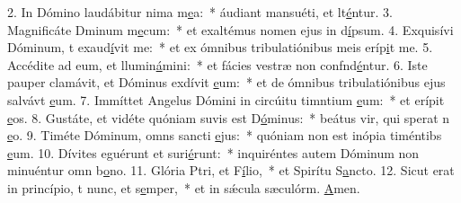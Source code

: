 2. In Dómino laudábitur nima m\uline{e}a:~* áudiant mansuéti, et lt\uline{é}ntur.
3. Magnificáte Dminum m\uline{e}cum:~* et exaltémus nomen ejus in d\uline{í}psum.
4. Exquisívi Dóminum, t exaud\uline{í}vit me:~* et ex ómnibus tribulatiónibus meis eríp\uline{i}t me.
5. Accédite ad eum, et llumin\uline{á}mini:~* et fácies vestræ non confnd\uline{é}ntur.
6. Iste pauper clamávit, et Dóminus exdívit \uline{e}um:~* et de ómnibus tribulatiónibus ejus salvávt \uline{e}um.
7. Immíttet Angelus Dómini in circúitu timntium \uline{e}um:~* et erípit \uline{e}os.
8. Gustáte, et vidéte quóniam suvis est D\uline{ó}minus:~* beátus vir, qui sperat n \uline{e}o.
9. Timéte Dóminum, omns sancti \uline{e}jus:~* quóniam non est inópia timéntibs \uline{e}um.
10. Dívites eguérunt et suri\uline{é}runt:~* inquiréntes autem Dóminum non minuéntur omn b\uline{o}no.
11. Glória Ptri, et F\uline{í}lio,~* et Spirítu S\uline{a}ncto.
12. Sicut erat in princípio, t nunc, et s\uline{e}mper,~* et in sǽcula sæculórm. \uline{A}men.
